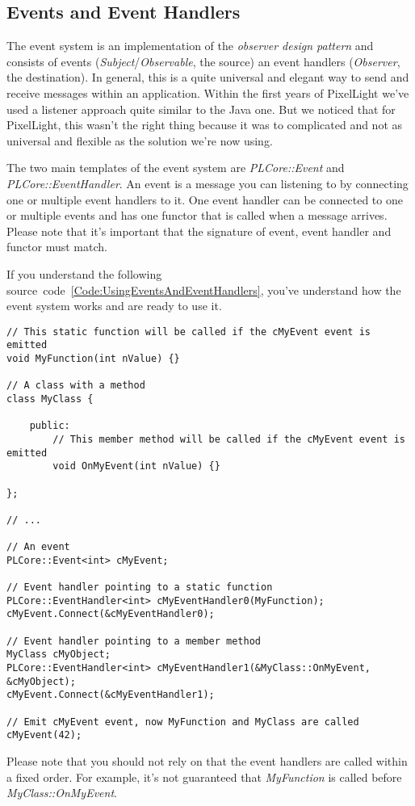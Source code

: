\subsection{Events and Event Handlers}
\label{Chapter:EventsAndEventHandlers}
The event system is an implementation of the \emph{observer design pattern} and consists of events (\emph{Subject}/\emph{Observable}, the source) an event handlers (\emph{Observer}, the destination). In general, this is a quite universal and elegant way to send and receive messages within an application. Within the first years of PixelLight we've used a listener approach quite similar to the Java one. But we noticed that for PixelLight, this wasn't the right thing because it was to complicated and not as universal and flexible as the solution we're now using.

The two main templates of the event system are \emph{PLCore::Event} and \emph{PLCore::EventHandler}. An event is a message you can listening to by connecting one or multiple event handlers to it. One event handler can be connected to one or multiple events and has one functor that is called when a message arrives. Please note that it's important that the signature of event, event handler and functor must match.

If you understand the following source~code~\ref{Code:UsingEventsAndEventHandlers}, you've understand how the event system works and are ready to use it.
\begin{lstlisting}[label=Code:UsingEventsAndEventHandlers,caption={Using events and event handlers}]
// This static function will be called if the cMyEvent event is emitted
void MyFunction(int nValue) {}

// A class with a method
class MyClass {

	public:
		// This member method will be called if the cMyEvent event is emitted
		void OnMyEvent(int nValue) {}

};

// ...

// An event
PLCore::Event<int> cMyEvent;

// Event handler pointing to a static function
PLCore::EventHandler<int> cMyEventHandler0(MyFunction);
cMyEvent.Connect(&cMyEventHandler0);

// Event handler pointing to a member method
MyClass cMyObject;
PLCore::EventHandler<int> cMyEventHandler1(&MyClass::OnMyEvent, &cMyObject);
cMyEvent.Connect(&cMyEventHandler1);

// Emit cMyEvent event, now MyFunction and MyClass are called
cMyEvent(42);
\end{lstlisting}
Please note that you should not rely on that the event handlers are called within a fixed order. For example, it's not guaranteed that \emph{MyFunction} is called before \emph{MyClass::OnMyEvent}.

